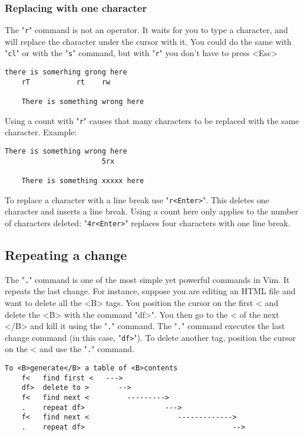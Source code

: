 \subsubsection{Replacing with one character}

The "\verb!r!" command is not an operator.
It waits for you to type a character, and will replace the character under the cursor with it.
You could do the same with "\verb!cl!" or with the "\verb!s!" command, but with "\verb!r!" you don't have to press <Esc>

\begin{Verbatim}[samepage=true]
    there is somerhing grong here 
    rT           rt    rw

    There is something wrong here 
\end{Verbatim}

Using a count with "\verb!r!" causes that many characters to be replaced with the same character.
Example:

\begin{Verbatim}[samepage=true]
    There is something wrong here 
                       5rx

    There is something xxxxx here 
\end{Verbatim}

To replace a character with a line break use "\verb!r<Enter>!".
This deletes one character and inserts a line break.
Using a count here only applies to the number of characters deleted: "\verb!4r<Enter>!" replaces four characters with one line break.

\subsection{Repeating a change}

The "\verb!.!" command is one of the most simple yet powerful commands in Vim.
It repeats the last change.
For instance, suppose you are editing an HTML file and want to delete all the <B> tags.
You position the cursor on the first < and delete the <B> with the command "df>".
You then go to the < of the next </B> and kill it using the "\verb!.!" command.
The "\verb!.!" command executes the last change command (in this case, "\verb!df>!").
To delete another tag, position the cursor on the < and use the "\verb!.!" command.

\begin{Verbatim}[samepage=true]
                        To <B>generate</B> a table of <B>contents 
    f<   find first <   --->
    df>  delete to >       -->
    f<   find next <         --------->
    .    repeat df>                   --->
    f<   find next <                     ------------->
    .    repeat df>                                   -->
\end{Verbatim}

